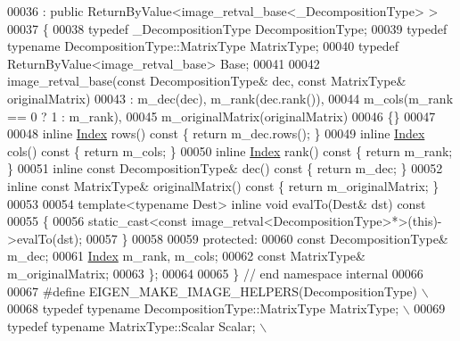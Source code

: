 \begin{DoxyCode}
00036  : \textcolor{keyword}{public} ReturnByValue<image\_retval\_base<\_DecompositionType> >
00037 \{
00038   \textcolor{keyword}{typedef} \_DecompositionType DecompositionType;
00039   \textcolor{keyword}{typedef} \textcolor{keyword}{typename} DecompositionType::MatrixType MatrixType;
00040   \textcolor{keyword}{typedef} ReturnByValue<image\_retval\_base> Base;
00041 
00042   image\_retval\_base(\textcolor{keyword}{const} DecompositionType& dec, \textcolor{keyword}{const} MatrixType& originalMatrix)
00043     : m\_dec(dec), m\_rank(dec.rank()),
00044       m\_cols(m\_rank == 0 ? 1 : m\_rank),
00045       m\_originalMatrix(originalMatrix)
00046   \{\}
00047 
00048   \textcolor{keyword}{inline} \hyperlink{namespace_eigen_a62e77e0933482dafde8fe197d9a2cfde}{Index} rows()\textcolor{keyword}{ const }\{ \textcolor{keywordflow}{return} m\_dec.rows(); \}
00049   \textcolor{keyword}{inline} \hyperlink{namespace_eigen_a62e77e0933482dafde8fe197d9a2cfde}{Index} cols()\textcolor{keyword}{ const }\{ \textcolor{keywordflow}{return} m\_cols; \}
00050   \textcolor{keyword}{inline} \hyperlink{namespace_eigen_a62e77e0933482dafde8fe197d9a2cfde}{Index} rank()\textcolor{keyword}{ const }\{ \textcolor{keywordflow}{return} m\_rank; \}
00051   \textcolor{keyword}{inline} \textcolor{keyword}{const} DecompositionType& dec()\textcolor{keyword}{ const }\{ \textcolor{keywordflow}{return} m\_dec; \}
00052   \textcolor{keyword}{inline} \textcolor{keyword}{const} MatrixType& originalMatrix()\textcolor{keyword}{ const }\{ \textcolor{keywordflow}{return} m\_originalMatrix; \}
00053 
00054   \textcolor{keyword}{template}<\textcolor{keyword}{typename} Dest> \textcolor{keyword}{inline} \textcolor{keywordtype}{void} evalTo(Dest& dst)\textcolor{keyword}{ const}
00055 \textcolor{keyword}{  }\{
00056     \textcolor{keyword}{static\_cast<}\textcolor{keyword}{const }image\_retval<DecompositionType>*\textcolor{keyword}{>}(\textcolor{keyword}{this})->evalTo(dst);
00057   \}
00058 
00059   \textcolor{keyword}{protected}:
00060     \textcolor{keyword}{const} DecompositionType& m\_dec;
00061     \hyperlink{namespace_eigen_a62e77e0933482dafde8fe197d9a2cfde}{Index} m\_rank, m\_cols;
00062     \textcolor{keyword}{const} MatrixType& m\_originalMatrix;
00063 \};
00064 
00065 \} \textcolor{comment}{// end namespace internal}
00066 
00067 \textcolor{preprocessor}{#define EIGEN\_MAKE\_IMAGE\_HELPERS(DecompositionType) \(\backslash\)}
00068 \textcolor{preprocessor}{  typedef typename DecompositionType::MatrixType MatrixType; \(\backslash\)}
00069 \textcolor{preprocessor}{  typedef typename MatrixType::Scalar Scalar; \(\backslash\)}

\end{DoxyCode}
